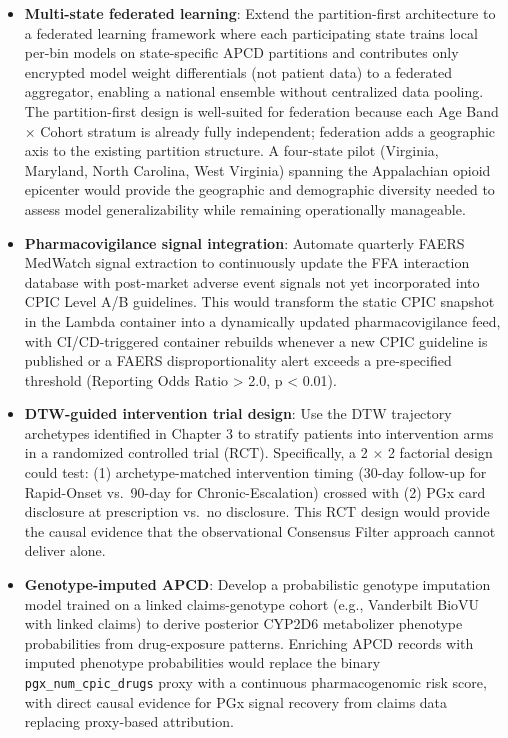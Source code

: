 \documentclass[
  12pt,
]{book}
\begin{document}
\begin{itemize}
\item
  \textbf{Multi-state federated learning}: Extend the partition-first
  architecture to a federated learning framework where each
  participating state trains local per-bin models on state-specific APCD
  partitions and contributes only encrypted model weight differentials
  (not patient data) to a federated aggregator, enabling a national
  ensemble without centralized data pooling. The partition-first design
  is well-suited for federation because each Age Band × Cohort stratum
  is already fully independent; federation adds a geographic axis to the
  existing partition structure. A four-state pilot (Virginia, Maryland,
  North Carolina, West Virginia) spanning the Appalachian opioid
  epicenter would provide the geographic and demographic diversity
  needed to assess model generalizability while remaining operationally
  manageable.
\item
  \textbf{Pharmacovigilance signal integration}: Automate quarterly
  FAERS MedWatch signal extraction to continuously update the FFA
  interaction database with post-market adverse event signals not yet
  incorporated into CPIC Level A/B guidelines. This would transform the
  static CPIC snapshot in the Lambda container into a dynamically
  updated pharmacovigilance feed, with CI/CD-triggered container
  rebuilds whenever a new CPIC guideline is published or a FAERS
  disproportionality alert exceeds a pre-specified threshold (Reporting
  Odds Ratio \textgreater{} 2.0, p \textless{} 0.01).
\item
  \textbf{DTW-guided intervention trial design}: Use the DTW trajectory
  archetypes identified in Chapter 3 to stratify patients into
  intervention arms in a randomized controlled trial (RCT).
  Specifically, a 2 × 2 factorial design could test: (1)
  archetype-matched intervention timing (30-day follow-up for
  Rapid-Onset vs.~90-day for Chronic-Escalation) crossed with (2) PGx
  card disclosure at prescription vs.~no disclosure. This RCT design
  would provide the causal evidence that the observational Consensus
  Filter approach cannot deliver alone.
\item
  \textbf{Genotype-imputed APCD}: Develop a probabilistic genotype
  imputation model trained on a linked claims-genotype cohort (e.g.,
  Vanderbilt BioVU with linked claims) to derive posterior CYP2D6
  metabolizer phenotype probabilities from drug-exposure patterns.
  Enriching APCD records with imputed phenotype probabilities would
  replace the binary \texttt{pgx\_num\_cpic\_drugs} proxy with a
  continuous pharmacogenomic risk score, with direct causal evidence for
  PGx signal recovery from claims data replacing proxy-based
  attribution.
\end{itemize}
\end{document}
